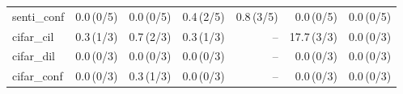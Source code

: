 \begin{table}[h]
\begin{tabular}{lrrrrrr}
senti\_conf & 0.0\,{\scriptsize(0/5)} & 0.0\,{\scriptsize(0/5)} & 0.4\,{\scriptsize(2/5)} & 0.8\,{\scriptsize(3/5)} & 0.0\,{\scriptsize(0/5)} & 0.0\,{\scriptsize(0/5)}\\
cifar\_cil & 0.3\,{\scriptsize(1/3)} & 0.7\,{\scriptsize(2/3)} & 0.3\,{\scriptsize(1/3)} & -- & 17.7\,{\scriptsize(3/3)} & 0.0\,{\scriptsize(0/3)}\\
cifar\_dil & 0.0\,{\scriptsize(0/3)} & 0.0\,{\scriptsize(0/3)} & 0.0\,{\scriptsize(0/3)} & -- & 0.0\,{\scriptsize(0/3)} & 0.0\,{\scriptsize(0/3)}\\
cifar\_conf & 0.0\,{\scriptsize(0/3)} & 0.3\,{\scriptsize(1/3)} & 0.0\,{\scriptsize(0/3)} & -- & 0.0\,{\scriptsize(0/3)} & 0.0\,{\scriptsize(0/3)}\\
\bottomrule\end{tabular}
\end{table}
